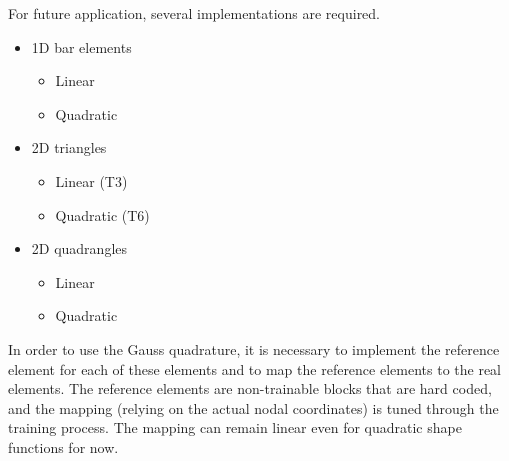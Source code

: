\documentclass{article}
\begin{document}
For future application, several implementations are required. 
\begin{itemize}
    \item[\faCogs] 1D bar elements 
    \begin{itemize}
            \item[\faChevronRight] Linear
        \item[\faChevronRight] Quadratic
    \end{itemize}
    \item[\faCogs] 2D triangles
    \begin{itemize}
        \item[\faChevronRight] Linear (T3)
        \item[\faChevronRight] Quadratic (T6)
    \end{itemize}
    \item[\faCogs] 2D quadrangles
    \begin{itemize}
        \item[\faChevronRight] Linear
        \item[\faChevronRight] Quadratic
    \end{itemize}
\end{itemize}

In order to use the Gauss quadrature, it is necessary to implement the reference element for each of these elements and to map the reference elements to the real elements. The reference elements are non-trainable blocks that are hard coded, and the mapping (relying on the actual nodal coordinates) is tuned through the training process. The mapping can remain linear even for quadratic shape functions for now.
\end{document}
